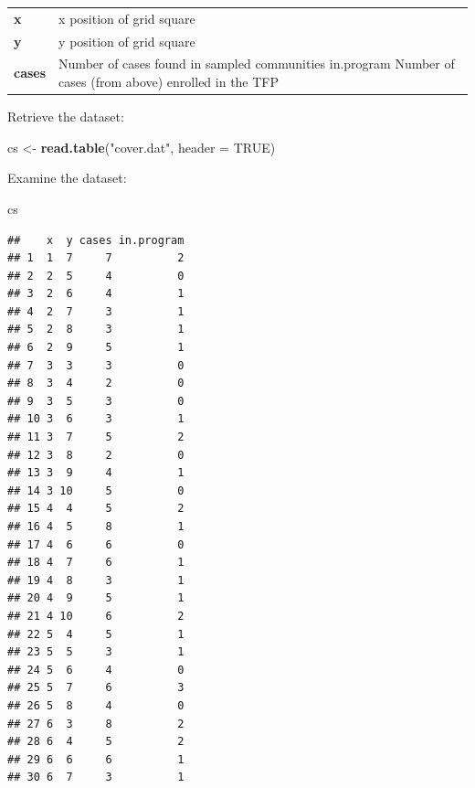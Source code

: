 \documentclass[12pt,a4paper]{book}
\newenvironment{Shaded}{\begin{snugshade}}{\end{snugshade}}
\newcommand{\KeywordTok}[1]{\textcolor[rgb]{0.13,0.29,0.53}{\textbf{#1}}}
\newcommand{\DataTypeTok}[1]{\textcolor[rgb]{0.13,0.29,0.53}{#1}}
\newcommand{\StringTok}[1]{\textcolor[rgb]{0.31,0.60,0.02}{#1}}
\newcommand{\OtherTok}[1]{\textcolor[rgb]{0.56,0.35,0.01}{#1}}
\newcommand{\NormalTok}[1]{#1}
\theoremstyle{definition}
\theoremstyle{definition}
\theoremstyle{definition}
\theoremstyle{remark}
\begin{document}
\begin{longtable}[]{@{}ll@{}}
\toprule
\begin{minipage}[t]{0.09\columnwidth}\raggedright
\textbf{x}\strut
\end{minipage} & \begin{minipage}[t]{0.85\columnwidth}\raggedright
x position of grid square\strut
\end{minipage}\tabularnewline
\begin{minipage}[t]{0.09\columnwidth}\raggedright
\textbf{y}\strut
\end{minipage} & \begin{minipage}[t]{0.85\columnwidth}\raggedright
y position of grid square\strut
\end{minipage}\tabularnewline
\begin{minipage}[t]{0.09\columnwidth}\raggedright
\textbf{cases}\strut
\end{minipage} & \begin{minipage}[t]{0.85\columnwidth}\raggedright
Number of cases found in sampled communities in.program Number of cases
(from above) enrolled in the TFP\strut
\end{minipage}\tabularnewline
\bottomrule
\end{longtable}

Retrieve the dataset:

\begin{Shaded}
\begin{Highlighting}[]
\NormalTok{cs <-}\StringTok{ }\KeywordTok{read.table}\NormalTok{(}\StringTok{"cover.dat"}\NormalTok{, }\DataTypeTok{header =} \OtherTok{TRUE}\NormalTok{)}
\end{Highlighting}
\end{Shaded}

Examine the dataset:

\begin{Shaded}
\begin{Highlighting}[]
\NormalTok{cs}
\end{Highlighting}
\end{Shaded}

\begin{verbatim}
##    x  y cases in.program
## 1  1  7     7          2
## 2  2  5     4          0
## 3  2  6     4          1
## 4  2  7     3          1
## 5  2  8     3          1
## 6  2  9     5          1
## 7  3  3     3          0
## 8  3  4     2          0
## 9  3  5     3          0
## 10 3  6     3          1
## 11 3  7     5          2
## 12 3  8     2          0
## 13 3  9     4          1
## 14 3 10     5          0
## 15 4  4     5          2
## 16 4  5     8          1
## 17 4  6     6          0
## 18 4  7     6          1
## 19 4  8     3          1
## 20 4  9     5          1
## 21 4 10     6          2
## 22 5  4     5          1
## 23 5  5     3          1
## 24 5  6     4          0
## 25 5  7     6          3
## 26 5  8     4          0
## 27 6  3     8          2
## 28 6  4     5          2
## 29 6  6     6          1
## 30 6  7     3          1
\end{verbatim}
\end{document}
